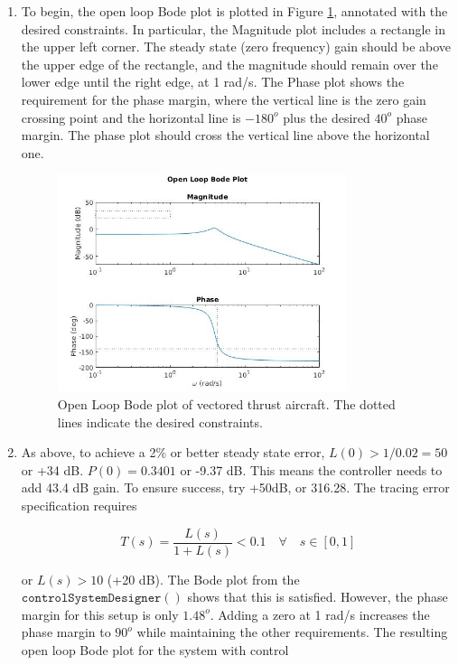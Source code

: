 \documentclass[11pt]{article}
\theoremstyle{definition}
\begin{document}
\begin{enumerate}
    \begin{enumerate}
        \item %
        To begin, the open loop Bode plot is plotted in Figure \ref{fig:2.a}, annotated with the desired constraints.  In particular, the Magnitude plot includes a rectangle in the upper left corner.  The steady state (zero frequency) gain should be above the upper edge of the rectangle, and the magnitude should remain over the lower edge until the right edge, at 1 rad/s.  The Phase plot shows the requirement for the phase margin, where the vertical line is the zero gain crossing point and the horizontal line is $-180^o$ plus the desired $40^o$ phase margin.  The phase plot should cross the vertical line above the horizontal one.

        \begin{figure}[H]
            \centering
            \includegraphics[width = 0.8\textwidth]{ES155P8_2a.jpg}
            \caption{Open Loop Bode plot of vectored thrust aircraft.  The dotted lines indicate the desired constraints.}
            \label{fig:2.a}
        \end{figure}

        \item %
        As above, to achieve a 2\% or better steady state error, $L(0) > 1/0.02 = 50$ or +34 dB.  $P(0) = 0.3401$ or -9.37 dB.  This means the controller needs to add 43.4 dB gain.  To ensure success, try +50dB, or 316.28.  The tracing error specification requires

        $$ T(s) = \frac{L(s)}{1 + L(s)} < 0.1 \quad \forall \quad s \in [0,1]$$

        or $L(s) > 10$ (+20 dB).  The Bode plot from the $\mathtt{controlSystemDesigner()}$ shows that this is satisfied.  However, the phase margin for this setup is only $1.48^o$.  Adding a zero at 1 rad/s increases the phase margin to $90^o$ while maintaining the other requirements. The resulting open loop Bode plot for the system with control


\end{enumerate}
\end{enumerate}
\end{document}
